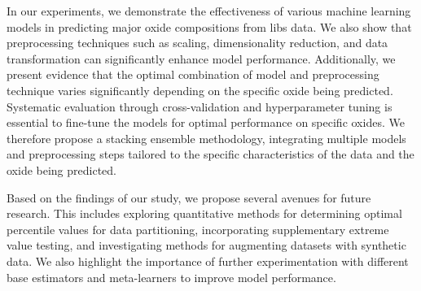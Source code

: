 \vspace{0.5em}

In our experiments, we demonstrate the effectiveness of various machine learning models in predicting major oxide compositions from \gls{libs} data.
We also show that preprocessing techniques such as scaling, dimensionality reduction, and data transformation can significantly enhance model performance.
Additionally, we present evidence that the optimal combination of model and preprocessing technique varies significantly depending on the specific oxide being predicted.
Systematic evaluation through cross-validation and hyperparameter tuning is essential to fine-tune the models for optimal performance on specific oxides.
We therefore propose a stacking ensemble methodology, integrating multiple models and preprocessing steps tailored to the specific characteristics of the data and the oxide being predicted.

\vspace{0.5em}

Based on the findings of our study, we propose several avenues for future research.
This includes exploring quantitative methods for determining optimal percentile values for data partitioning, incorporating supplementary extreme value testing, and investigating methods for augmenting datasets with synthetic data.
We also highlight the importance of further experimentation with different base estimators and meta-learners to improve model performance.

\glsresetall
